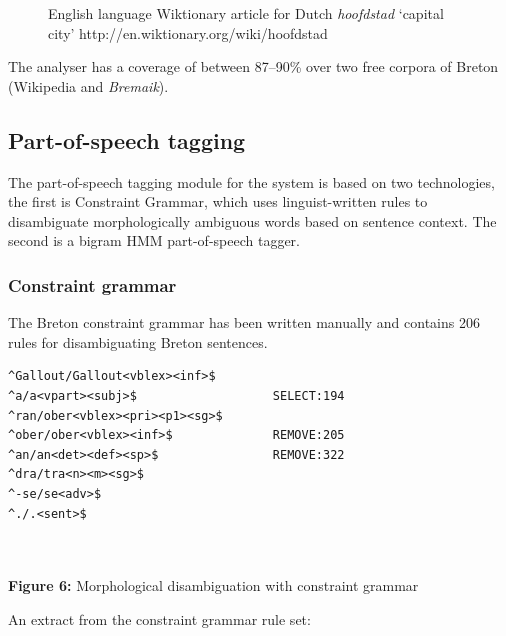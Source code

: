 \documentclass[a0,landscape]{a0poster}
\begin{document}
\begin{multicols}{4}
\begin{figure}
\begin{tiny}
\begin{tabular}{|l|}
\hline
\end{tabular}
\end{tiny}
\caption{English language Wiktionary article for Dutch \emph{hoofdstad} `capital city' 
    {\small {http://en.wiktionary.org/wiki/hoofdstad}}}
\label{fig:wikt1}
\end{figure}
\vspace{0.5cm}

\noindent
The analyser has a coverage of between 87--90\% over two free corpora of Breton (Wikipedia and \emph{Bremaik}).

\subsection{Part-of-speech tagging}

\noindent
The part-of-speech tagging module for the system is based on two technologies, the first is 
Constraint Grammar, which uses linguist-written rules to disambiguate
morphologically ambiguous words based on sentence context. The second is a
bigram HMM part-of-speech tagger.

\subsubsection{Constraint grammar}

\noindent
The Breton constraint grammar has been written manually and contains 206 rules
for disambiguating Breton sentences. \\

\begin{center}
\begin{minipage}[b]{25cm}
\begin{small}
\begin{verbatim}
^Gallout/Gallout<vblex><inf>$    
^a/a<vpart><subj>$                   SELECT:194
^ran/ober<vblex><pri><p1><sg>$ 
^ober/ober<vblex><inf>$              REMOVE:205
^an/an<det><def><sp>$                REMOVE:322
^dra/tra<n><m><sg>$ 
^-se/se<adv>$
^./.<sent>$
\end{verbatim}
\end{small}
\end{minipage}\\
~\\
\textbf{Figure 6:} Morphological disambiguation with constraint grammar
\vspace{0.5cm}
\end{center}

\noindent
An extract from the constraint grammar rule set:\\


\end{multicols}
\end{document}
